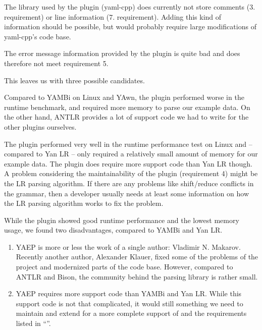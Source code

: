 \begin{description}[style=multiline, leftmargin=2cm, font=\bfseries]
  \item[YAML CPP] The library used by the plugin (yaml-cpp) does currently not store comments (3. requirement) or line information (7. requirement). Adding this kind of information should be possible, but would probably require large modifications of yaml-cpp’s code base.

  \item[YAy PEG] The error message information provided by the plugin is quite bad and does therefore not meet requirement 5.
\end{description}

This leaves us with three possible candidates.

\begin{description}[style=multiline, leftmargin=2cm, font=\bfseries]
  \item[Yan LR] Compared to YAMBi on Linux and YAwn, the plugin performed worse in the runtime benchmark, and required more memory to parse our example data. On the other hand, ANTLR provides a lot of support code we had to write for the other plugins ourselves.

  \item[YAMBi] The plugin performed very well in the runtime performance test on Linux and – compared to Yan LR – only required a relatively small amount of memory for our example data. The plugin does require more support code than Yan LR though. A problem considering the maintainability of the plugin (requirement 4) might be the LR parsing algorithm. If there are any problems like shift/reduce conflicts in the grammar, then a developer usually needs at least some information on how the LR parsing algorithm works to fix the problem.

  \item[YAwn] While the plugin showed good runtime performance and the lowest memory usage, we found two disadvantages, compared to YAMBi and Yan LR.

  \begin{enumerate}
    \item YAEP is more or less the work of a single author: Vladimir N. Makarov. Recently another author, Alexander Klauer, fixed some of the problems of the project and modernized parts of the code base. However, compared to ANTLR and Bison, the community behind the parsing library is rather small.

    \item YAEP requires more support code than YAMBi and Yan LR. While this support code is not that complicated, it would still something we need to maintain and extend for a more complete support of  and the requirements listed in “”.
  \end{enumerate}

\end{description}

